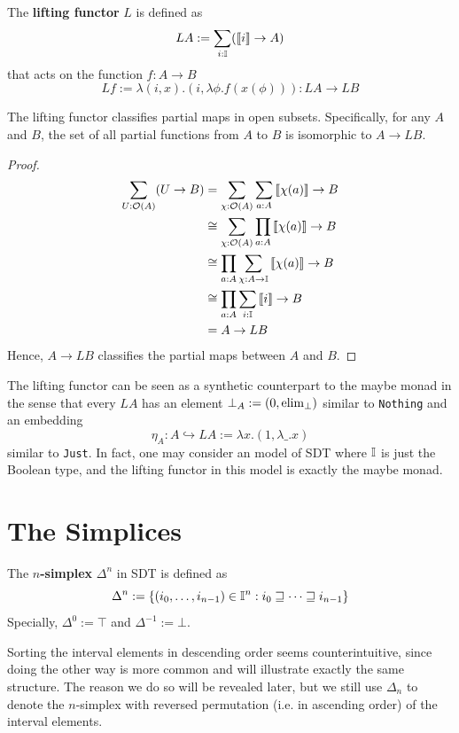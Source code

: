 \begin{definition}
    The \textbf{lifting functor} $L$ is defined as
    $$LA:=\sum_{i:\mathbb{I}}(\left\llbracket i\right\rrbracket\to A)$$
    that acts on the function $f:A\to B$
    $$Lf:=\lambda(i,x).(i,\lambda\phi.f(x(\phi))):LA\to LB$$
\end{definition}
\begin{theorem}
    \label{thm-classifier}
    The lifting functor classifies partial maps in open subsets. Specifically, for any $A$ and $B$, the set of all partial functions from $A$ to $B$ is isomorphic to $A\to LB$.
\end{theorem}
\begin{proof}
    $$\begin{aligned}
        \sum_{U:\mathcal{O}(A)}(U\to B)&=\sum_{\chi:\mathcal{O}(A)}\sum_{a:A}\left\llbracket\chi(a)\right\rrbracket\to B \\
        &\cong\sum_{\chi:\mathcal{O}(A)}\prod_{a:A}\left\llbracket\chi(a)\right\rrbracket\to B \\
        &\cong\prod_{a:A}\sum_{\chi:A\to\mathbb{I}}\left\llbracket\chi(a)\right\rrbracket\to B \\
        &\cong\prod_{a:A}\sum_{i:\mathbb{I}}\left\llbracket i\right\rrbracket\to B \\
        &=A\to LB
    \end{aligned}$$
    Hence, $A\to LB$ classifies the partial maps between $A$ and $B$.
\end{proof}
The lifting functor can be seen as a synthetic counterpart to the maybe monad in the sense that every $LA$ has an element $\bot_A:=(0,\operatorname{elim}_\bot)$ similar to \verb|Nothing| and an embedding
$$\eta_A:A\hookrightarrow LA:=\lambda x.(1,\lambda\_.x)$$
similar to \verb|Just|. In fact, one may consider an model of SDT where $\mathbb{I}$ is just the Boolean type, and the lifting functor in this model is exactly the maybe monad.

\section{The Simplices}
\begin{definition}
    The \textbf{$n$-simplex} $\Delta^n$ in SDT is defined as
    $$\Delta^n:=\left\{(i_0,\dots,i_{n-1})\in\mathbb{I}^n:i_0\sqsupseteq\dots\sqsupseteq i_{n-1}\right\}$$
    Specially, $\Delta^0:=\top$ and $\Delta^{-1}:=\bot$.
\end{definition}
Sorting the interval elements in descending order seems counterintuitive, since doing the other way is more common and will illustrate exactly the same structure. The reason we do so will be revealed later, but we still use $\Delta_n$ to denote the $n$-simplex with reversed permutation (i.e. in ascending order) of the interval elements.

